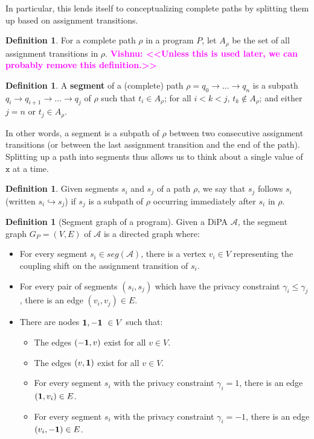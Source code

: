 \documentclass[12pt]{article}
\newcommand{\todo}[2]{\textcolor{#1}{\textbf{#2}}}
\newcommand{\vishnu}[1]{\todo{magenta}{Vishnu: <<#1>>}}
\theoremstyle{definition}
\newtheorem{defn}[thm]{Definition}
\begin{document}
In particular, this lends itself to conceptualizing complete paths by splitting them up based on assignment transitions. 

\begin{defn}
    For a complete path $\rho$ in a program $P$, let $A_\rho$ be the set of all assignment transitions in $\rho$. \vishnu{Unless this is used later, we can probably remove this definition.}
\end{defn}

\begin{defn}
    A \textbf{segment} of a (complete) path $\rho = q_0\to\ldots\to q_n$ is a subpath $q_i \to q_{i+1}\to \ldots \to q_j$ of $\rho$ such that $t_i \in A_\rho$; for all $i<k<j$, $t_k \notin A_\rho$; and either $j=n$ or $t_j \in A_\rho$.
\end{defn}

In other words, a segment is a subpath of $\rho$ between two consecutive assignment transitions (or between the last assignment transition and the end of the path). Splitting up a path into segments thus allows us to think about a single value of $\texttt{x}$ at a time.


\begin{defn}
    Given segments $s_i$ and $s_j$ of a path $\rho$, we say that $s_j$ follows $s_i$ (written $s_i \hookrightarrow s_j$) if $s_j$ is a subpath of $\rho$ occurring immediately after $s_i$ in $\rho$.
\end{defn}


\begin{defn}[Segment graph of a program]
    Given a DiPA $\mathcal{A}$, the segment graph $G_P = (V, E)$ of $\mathcal{A}$ is a directed graph where: 
    \begin{itemize}
        \item For every segment $s_i \in seg(\mathcal{A})$, there is a vertex $v_i \in V$ representing the coupling shift on the assignment transition of $s_i$.
        \item For every pair of segments $(s_i, s_j)$ which have the privacy constraint $\gamma_i \leq \gamma_j$, there is an edge $(v_i, v_j) \in E$.
        \item There are nodes ${\bf 1, -1}\ \in V$ such that: 
        \begin{itemize}
            \item The edges $({\bf -1}, v)$ exist for all $v \in V$.
            \item The edges $(v, {\bf 1})$ exist for all $v \in V$.
            \item For every segment $s_i$ with the privacy constraint $\gamma_i = 1$, there is an edge $({\bf 1}, v_i) \in E$.
            \item For every segment $s_i$ with the privacy constraint $\gamma_i = -1$, there is an edge $(v_i, {\bf -1}) \in E$. 
        \end{itemize}
    \end{itemize}
\end{defn}
\end{document}
